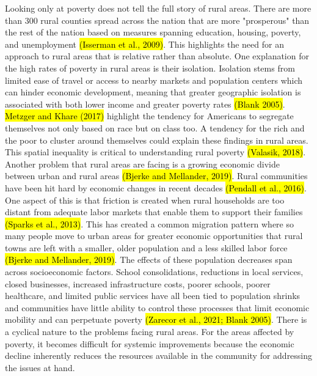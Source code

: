  Looking only at poverty does not tell the full story of rural areas. There are more than 300 rural counties spread across the nation that are more "prosperous" than the rest of the nation based on measures spanning education, housing, poverty, and unemployment \hl{(Isserman et al., 2009)}.  This highlights the need for an approach to rural areas that is relative rather than absolute. One explanation for the high rates of poverty in rural areas is their isolation. Isolation stems from limited ease of travel or access to nearby markets and population centers which can hinder economic development, meaning that greater geographic isolation is associated with both lower income and greater poverty rates \hl{(Blank 2005)}. \hl{Metzger and Khare (2017)} highlight the tendency for Americans to segregate themselves not only based on race but on class too. A tendency for the rich and the poor to cluster around themselves could explain these findings in rural areas. This spatial inequality is critical to understanding rural poverty \hl{(Valasik, 2018)}. Another problem that rural areas are facing is a growing economic divide between urban and rural areas \hl{(Bjerke and Mellander, 2019)}.  Rural communities have been hit hard by economic changes in recent decades \hl{(Pendall et al., 2016)}. One aspect of this is that friction is created when rural households are too distant from adequate labor markets that enable them to support their families \hl{(Sparks et al., 2013)}. This has created a common migration pattern where so many people move to urban areas for greater economic opportunities that rural towns are left with a smaller, older population and a less skilled labor force \hl{(Bjerke and Mellander, 2019)}. The effects of these population decreases span across socioeconomic factors. School consolidations, reductions in local services, closed businesses, increased infrastructure costs, poorer schools, poorer healthcare, and limited public services have all been tied to population shrinks and communities have little ability to control these processes that limit economic mobility and can perpetuate poverty \hl{(Zarecor et al., 2021; Blank 2005)}. There is a cyclical nature to the problems facing rural areas. For the areas affected by poverty, it becomes difficult for systemic improvements because the economic decline inherently reduces the resources available in the community for addressing the issues at hand.


